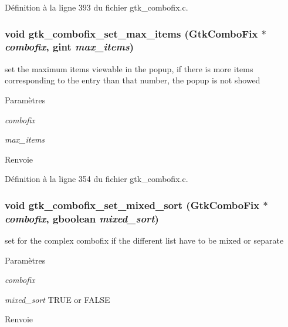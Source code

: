 Définition à la ligne 393 du fichier gtk\_\-combofix.c.

\subsubsection[{gtk\_\-combofix\_\-set\_\-max\_\-items}]{\setlength{\rightskip}{0pt plus 5cm}void gtk\_\-combofix\_\-set\_\-max\_\-items ({\bf GtkComboFix} $\ast$ {\em combofix}, \/  gint {\em max\_\-items})}\label{gtk__combofix_8c_a5f12519f66c3da8248e512bf6b584d29}
set the maximum items viewable in the popup, if there is more items corresponding to the entry than that number, the popup is not showed


\begin{DoxyParams}{Paramètres}
\item[{\em combofix}]\item[{\em max\_\-items}]\end{DoxyParams}
\begin{DoxyReturn}{Renvoie}

\end{DoxyReturn}


Définition à la ligne 354 du fichier gtk\_\-combofix.c.

\subsubsection[{gtk\_\-combofix\_\-set\_\-mixed\_\-sort}]{\setlength{\rightskip}{0pt plus 5cm}void gtk\_\-combofix\_\-set\_\-mixed\_\-sort ({\bf GtkComboFix} $\ast$ {\em combofix}, \/  gboolean {\em mixed\_\-sort})}\label{gtk__combofix_8c_a4d9749a858856cb3818749500a0a3d86}
set for the complex combofix if the different list have to be mixed or separate


\begin{DoxyParams}{Paramètres}
\item[{\em combofix}]\item[{\em mixed\_\-sort}]TRUE or FALSE\end{DoxyParams}
\begin{DoxyReturn}{Renvoie}

\end{DoxyReturn}



